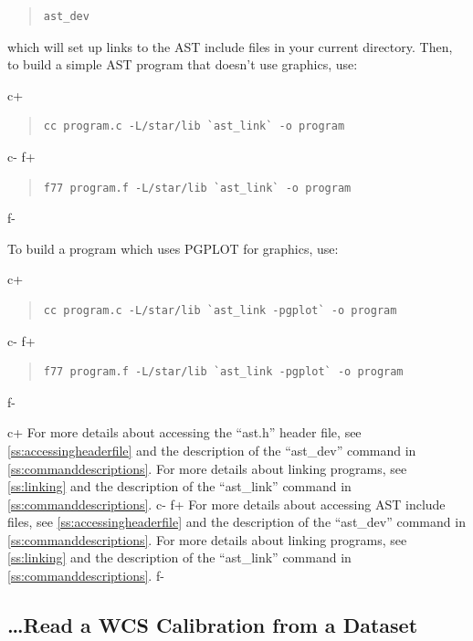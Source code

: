 \documentclass[twoside,11pt]{article}
\newcommand{\appref}[1]{Appendix~\ref{#1}}
\newcommand{\secref}[1]{\S\ref{#1}}
\renewcommand{\appref}[1]{\ref{#1}}
\renewcommand{\secref}[1]{\ref{#1}}
\begin{document}
\begin{quote}
\small
\begin{verbatim}
ast_dev
\end{verbatim}
\normalsize
\end{quote}

which will set up links to the AST include files in your current
directory.  Then, to build a simple AST program that doesn't use
graphics, use:

c+
\begin{quote}
\small
\begin{verbatim}
cc program.c -L/star/lib `ast_link` -o program
\end{verbatim}
\normalsize
\end{quote}
c-
f+
\begin{quote}
\small
\begin{verbatim}
f77 program.f -L/star/lib `ast_link` -o program
\end{verbatim}
\normalsize
\end{quote}
f-

To build a program which uses PGPLOT for graphics, use:

c+
\begin{quote}
\small
\begin{verbatim}
cc program.c -L/star/lib `ast_link -pgplot` -o program
\end{verbatim}
\normalsize
\end{quote}
c-
f+
\begin{quote}
\small
\begin{verbatim}
f77 program.f -L/star/lib `ast_link -pgplot` -o program
\end{verbatim}
\normalsize
\end{quote}
f-

c+
For more details about accessing the ``ast.h'' header file, see
\secref{ss:accessingheaderfile} and the description of the
``ast\_dev'' command in \appref{ss:commanddescriptions}.  For more
details about linking programs, see \secref{ss:linking} and the
description of the ``ast\_link'' command in
\appref{ss:commanddescriptions}.
c-
f+
For more details about accessing AST include files, see
\secref{ss:accessingheaderfile} and the description of the
``ast\_dev'' command in \appref{ss:commanddescriptions}.  For more
details about linking programs, see \secref{ss:linking} and the
description of the ``ast\_link'' command in
\appref{ss:commanddescriptions}.
f-

\subsection{\label{ss:howtoreadwcs}\ldots Read a WCS Calibration from a Dataset}
\end{document}
